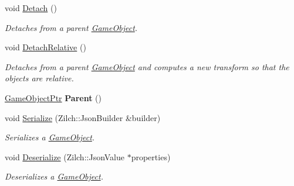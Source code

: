 \begin{DoxyCompactItemize}
void \hyperlink{classDCEngine_1_1GameObject_a0282811bdb3c33b3538eef2357b17b4b}{Detach} ()
\begin{DoxyCompactList}\small\item\em Detaches from a parent \hyperlink{classDCEngine_1_1GameObject}{Game\-Object}. \end{DoxyCompactList}\item 
void \hyperlink{classDCEngine_1_1GameObject_a97349cfe35109c94b2994de3d14df09c}{Detach\-Relative} ()
\begin{DoxyCompactList}\small\item\em Detaches from a parent \hyperlink{classDCEngine_1_1GameObject}{Game\-Object} and computes a new transform so that the objects are relative. \end{DoxyCompactList}\item 
\hypertarget{classDCEngine_1_1GameObject_a270b3fd2736f75a68962800379a1e65b}{\hyperlink{classDCEngine_1_1GameObject}{Game\-Object\-Ptr} {\bfseries Parent} ()}\label{classDCEngine_1_1GameObject_a270b3fd2736f75a68962800379a1e65b}

\item 
void \hyperlink{classDCEngine_1_1GameObject_aeeee6e87e8502429522865bd31fcb717}{Serialize} (Zilch\-::\-Json\-Builder \&builder)
\begin{DoxyCompactList}\small\item\em Serializes a \hyperlink{classDCEngine_1_1GameObject}{Game\-Object}. \end{DoxyCompactList}\item 
void \hyperlink{classDCEngine_1_1GameObject_a0cb1588a3f505a98ec40fb811888d1c1}{Deserialize} (Zilch\-::\-Json\-Value $\ast$properties)
\begin{DoxyCompactList}\small\item\em Deserializes a \hyperlink{classDCEngine_1_1GameObject}{Game\-Object}. \end{DoxyCompactList}\end{DoxyCompactItemize}
